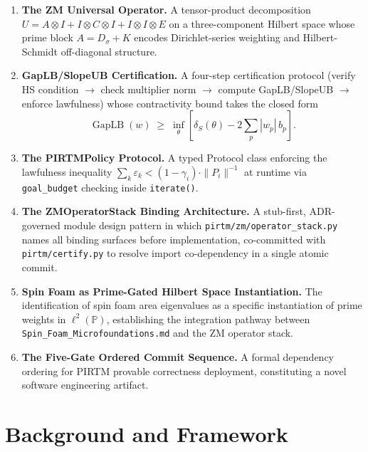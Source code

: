 \documentclass[12pt,letterpaper]{article}
\theoremstyle{definition}
\theoremstyle{remark}
\begin{document}
\begin{enumerate}[leftmargin=*]

\item \textbf{The ZM Universal Operator.}
A tensor-product decomposition
$U = A \otimes I + I \otimes C \otimes I + I \otimes I \otimes E$
on a three-component Hilbert space whose prime block $A = D_\sigma + K$
encodes Dirichlet-series weighting and Hilbert-Schmidt off-diagonal structure.

\item \textbf{GapLB/SlopeUB Certification.}
A four-step certification protocol (verify HS condition $\to$ check
multiplier norm $\to$ compute GapLB/SlopeUB $\to$ enforce lawfulness) whose
contractivity bound takes the closed form
\[
  \operatorname{GapLB}(w) \;\geq\;
  \inf_\theta \!\left[\delta_S(\theta) - 2\sum_p |w_p|\, b_p \right].
\]

\item \textbf{The PIRTMPolicy Protocol.}
A typed Protocol class enforcing the lawfulness inequality
$\sum_k \varepsilon_k < (1 - \gamma_i)\cdot\|P_i\|^{-1}$
at runtime via \texttt{goal\_budget} checking inside \texttt{iterate()}.

\item \textbf{The ZMOperatorStack Binding Architecture.}
A stub-first, ADR-governed module design pattern in which
\texttt{pirtm/zm/operator\_stack.py} names all binding surfaces before
implementation, co-committed with \texttt{pirtm/certify.py} to resolve
import co-dependency in a single atomic commit.

\item \textbf{Spin Foam as Prime-Gated Hilbert Space Instantiation.}
The identification of spin foam area eigenvalues as a specific instantiation
of prime weights in $\ell^2(\mathbb{P})$, establishing the integration
pathway between \texttt{Spin\_Foam\_Microfoundations.md} and the ZM
operator stack.

\item \textbf{The Five-Gate Ordered Commit Sequence.}
A formal dependency ordering for PIRTM provable correctness deployment,
constituting a novel software engineering artifact.

\end{enumerate}

\section{Background and Framework}
\label{sec:background}
\end{document}
